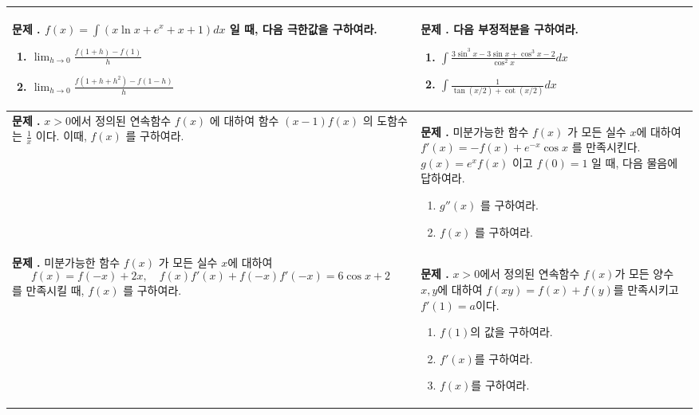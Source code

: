 \documentclass[10pt, a4paper]{article} %
\newcounter{probcount}
\newcommand{\exercise}[1]{%
    \stepcounter{probcount}%
    \begin{minipage}[t][110mm][t]{0.44\textwidth}
        \small %
        \vspace{1mm}
        \noindent \textbf{문제 \arabic{probcount}.} #1
    \end{minipage}%
}
\begin{document}
\noindent
\begin{longtable}{p{} | p{}}
    
    \exercise{$f(x)=\int(x \ln x+e^{x}+x+1)dx$ 일 때, 다음 극한값을 구하여라.
    \begin{enumerate}[label=(\arabic*)]
        \item $\displaystyle \lim_{h\rightarrow0}\frac{f(1+h)-f(1)}{h}$
        \item $\displaystyle \lim_{h\rightarrow0}\frac{f(1+h+h^{2})-f(1-h)}{h}$
    \end{enumerate}}
    & 
    \exercise{다음 부정적분을 구하여라.
    \begin{enumerate}[label=(\arabic*)]
        \item $\displaystyle \int\frac{3 \sin^{3}x-3 \sin x+\cos^{3}x-2}{\cos^{2}x}dx$
        \item $\displaystyle \int\frac{1}{\tan(x/2)+\cot(x/2)}dx$
    \end{enumerate}}\\
    \hline

    \exercise{$x>0$에서 정의된 연속함수 $f(x)$ 에 대하여 함수 $(x-1)f(x)$ 의 도함수는 $\frac{1}{x}$ 이다. 이때, $f(x)$ 를 구하여라.}
    & 
    \exercise{미분가능한 함수 $f(x)$ 가 모든 실수 $x$에 대하여 $f'(x)=-f(x)+e^{-x}\cos x$ 를 만족시킨다. $g(x)=e^{x}f(x)$ 이고 $f(0)=1$ 일 때, 다음 물음에 답하여라.
    \begin{enumerate}[label=(\arabic*)]
    \item $g''(x)$ 를 구하여라.
    \item $f(x)$ 를 구하여라.
    \end{enumerate}} \\
 
    
    \exercise{미분가능한 함수 $f(x)$ 가 모든 실수 $x$에 대하여 
    \[ f(x)=f(-x)+2x, \quad f(x)f'(x)+f(-x)f'(-x)=6 \cos x+2 \]
    를 만족시킬 때, $f(x)$ 를 구하여라.}
    & 
    \exercise{$x>0$에서 정의된 연속함수 $f(x)$가 모든 양수 $x, y$에 대하여 $f(xy)=f(x)+f(y)$를 만족시키고 $f'(1)=a$이다.
    \begin{enumerate}[label=(\arabic*)]
        \item $f(1)$의 값을 구하여라.
        \item $f'(x)$를 구하여라.
        \item $f(x)$를 구하여라.
    \end{enumerate} } \\

    
   
\end{longtable}
\end{document}
